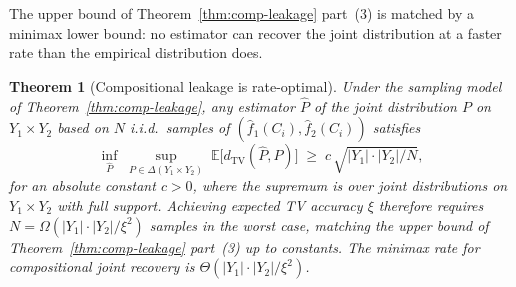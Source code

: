 \documentclass[11pt]{article}
\theoremstyle{definition}
\theoremstyle{plain}
\newtheorem{theorem}{Theorem}[section]
\theoremstyle{remark}
\newcommand{\fhat}{\hat{f}}
\newcommand{\TV}{d_{\mathrm{TV}}}
\begin{document}
The upper bound of Theorem~\ref{thm:comp-leakage} part~(3) is
matched by a minimax lower bound: no estimator can recover the joint
distribution at a faster rate than the empirical distribution does.

\begin{theorem}[Compositional leakage is rate-optimal]
\label{thm:comp-leakage-lb}
Under the sampling model of Theorem~\ref{thm:comp-leakage}, any
estimator $\hat{P}$ of the joint distribution $P$ on $Y_1 \times Y_2$
based on $N$ i.i.d.\ samples of $(\fhat_1(C_i), \fhat_2(C_i))$
satisfies
\begin{equation}
\label{eq:lecam-lb}
\inf_{\hat{P}} \;\sup_{P \in \Delta(Y_1 \times Y_2)} \;
\mathbb{E}\bigl[\TV(\hat{P}, P)\bigr] \;\geq\; c\,\sqrt{|Y_1| \cdot |Y_2| / N},
\end{equation}
for an absolute constant $c > 0$, where the supremum is over joint
distributions on $Y_1 \times Y_2$ with full support.  Achieving expected
TV accuracy $\xi$ therefore requires $N = \Omega(|Y_1| \cdot |Y_2| / \xi^2)$
samples in the worst case, matching the upper bound of
Theorem~\ref{thm:comp-leakage} part~(3) up to constants.  The minimax
rate for compositional joint recovery is
$\Theta(|Y_1| \cdot |Y_2| / \xi^2)$.
\end{theorem}
\end{document}
